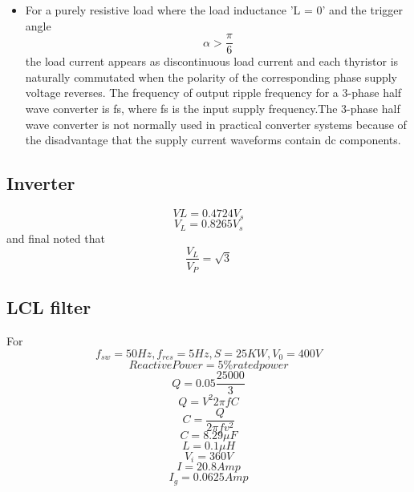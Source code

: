 \begin{itemize}
\item For a purely resistive load where the load inductance 'L = 0' and the trigger angle 
\begin{equation}
	\alpha >\frac{\pi }{6} 
	\end{equation}
 the load current appears as discontinuous load current and each thyristor is naturally commutated when the polarity of the corresponding phase supply voltage reverses. The frequency of output ripple frequency for a 3-phase half wave converter is fs, where fs is the input supply frequency.The 3-phase half wave converter is not normally used in practical converter systems because of the disadvantage that the supply current waveforms contain dc components.
\end{itemize}

\subsection{Inverter}
\begin{equation}
	V{L} = 0.4724 V_{s} 
\end{equation}
\begin{equation}
	V_{L}= 0.8265 V_{s}
\end{equation}
and final noted that
\begin{equation}
	\frac{V_{L}}{V_{P}} = \sqrt{3}
\end{equation}
\subsection{LCL filter}
For  
\begin{equation}
	f_{sw} =50Hz , f_{res} =5Hz , S = 25KW , V_{0} = 400V
	\end{equation}
\begin{equation}
	Reactive Power = 5 \% rated power
\end{equation}
\begin{equation}
	Q = 0.05 \frac{25000}{3}
\end{equation}
\begin{equation}
	Q =V^2 2 \pi f C
\end{equation}
\begin{equation}
	C = \frac{Q}{2 \pi f v^2}
\end{equation}
\begin{equation}
	C = 8.29 \mu F
\end{equation}
\begin{equation}
	L = 0.1 \mu H
\end{equation}
\begin{equation}
	V_{i} = 360 V
\end{equation}
\begin{equation}
	I = 20.8Amp
\end{equation}
\begin{equation}
	I_{g} = 0.0625 Amp
\end{equation}
